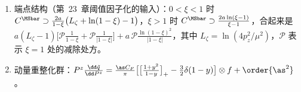 \begin{proposition}
\begin{enumerate}[label=(\alph*),leftmargin=2em,itemsep=2pt,topsep=2pt]
\begin{equation}
\begin{split}
\end{split}
\end{equation}
\begin{equation}\label{eq:lamet-Cratio}
C^{\rm ratio}(\xi)=\delta(1-\xi)+a\begin{cases}\big[\frac{1+\xi^2}{1-\xi}\ln\frac\xi{\xi-1}+1-\frac3{2(1-\xi)}\big]^{[1,\infty]}_{+(1)},&\xi>1\\[3pt]\big[\frac{1+\xi^2}{1-\xi}\big(-\ell_p+\ln(\xi(1-\xi))-1\big)+1+\frac3{2(1-\xi)}\big]^{[0,1]}_{+(1)},&0<\xi<1\\[3pt]\big[-\frac{1+\xi^2}{1-\xi}\ln\frac{-\xi}{1-\xi}-1+\frac3{2(1-\xi)}\big]^{[-\infty,0]}_{+(1)},&\xi<0\end{cases}
\end{equation}%
对 $\gamma^z$，$\MSbar$ 核加 $2a(1-\xi)\theta(0<\xi<1)$，比值核加 $a[2(1-\xi)]^{[0,1]}_{+(1)}$。
\item 端点结构（第~23~章阈值因子化的输入）：$0<\xi<1$ 时 $C^{\MSbar}\supset\frac{2a}{1-\xi}\big(L_\zeta+\ln(1-\xi)-1\big)$，$\xi>1$ 时 $C^{\MSbar}\supset\frac{2a\ln(\xi-1)}{\xi-1}$，合起来是
$a(L_\zeta-1)\big[\mathcal P\frac1{1-\xi}+\mathcal P\frac1{|1-\xi|}\big]+a\,\mathcal P\frac{\ln(1-\xi)^2}{|1-\xi|}$，其中 $L_\zeta=\ln(4p_z^2/\mu^2)$，$\mathcal P$ 表示 $\xi=1$ 处的减除处方。
\item 动量重整化群：$P^z\frac{\dd\tilde q}{\dd P^z}=\frac{\as C_F}\pi\big[\big[\frac{1+y^2}{1-y}\big]_+-\frac32\delta(1-y)\big]\otimes f+\order{\as^2}$。
\end{enumerate}
\end{proposition}


